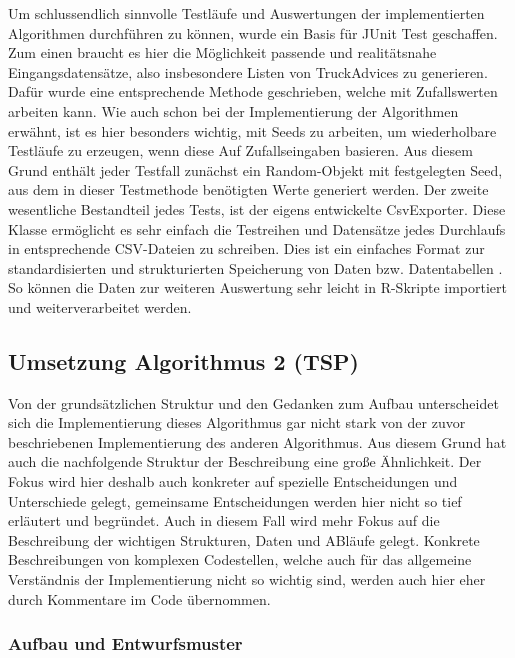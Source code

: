
Um schlussendlich sinnvolle Testläufe und Auswertungen der implementierten Algorithmen durchführen zu können, wurde ein Basis für JUnit Test geschaffen. Zum einen braucht es hier die Möglichkeit passende und realitätsnahe Eingangsdatensätze, also insbesondere Listen von TruckAdvices zu generieren. Dafür wurde eine entsprechende Methode geschrieben, welche mit Zufallswerten arbeiten kann. Wie auch schon bei der Implementierung der Algorithmen erwähnt, ist es hier besonders wichtig, mit Seeds zu arbeiten, um wiederholbare Testläufe zu erzeugen, wenn diese Auf Zufallseingaben basieren. Aus diesem Grund enthält jeder Testfall zunächst ein Random-Objekt mit festgelegten Seed, aus dem in dieser Testmethode benötigten Werte generiert werden. Der zweite wesentliche Bestandteil jedes Tests, ist der eigens entwickelte CsvExporter. Diese Klasse ermöglicht es sehr einfach die Testreihen und Datensätze jedes Durchlaufs in entsprechende CSV-Dateien zu schreiben. Dies ist ein einfaches Format zur standardisierten und strukturierten Speicherung von Daten bzw. Datentabellen . So können die Daten zur weiteren Auswertung sehr leicht in R-Skripte importiert und weiterverarbeitet werden.



\subsection{Umsetzung Algorithmus 2 (TSP)}

Von der grundsätzlichen Struktur und den Gedanken zum Aufbau unterscheidet sich die Implementierung dieses Algorithmus gar nicht stark von der zuvor beschriebenen Implementierung des anderen Algorithmus. Aus diesem Grund hat auch die nachfolgende Struktur der Beschreibung eine große Ähnlichkeit. Der Fokus wird hier deshalb auch konkreter auf spezielle Entscheidungen und Unterschiede gelegt, gemeinsame Entscheidungen werden hier nicht so tief erläutert und begründet. Auch in diesem Fall wird mehr Fokus auf die Beschreibung der wichtigen Strukturen, Daten und ABläufe gelegt. Konkrete Beschreibungen von komplexen Codestellen, welche auch für das allgemeine Verständnis der Implementierung nicht so wichtig sind, werden auch hier eher durch Kommentare im Code übernommen.

\subsubsection{Aufbau und Entwurfsmuster}

